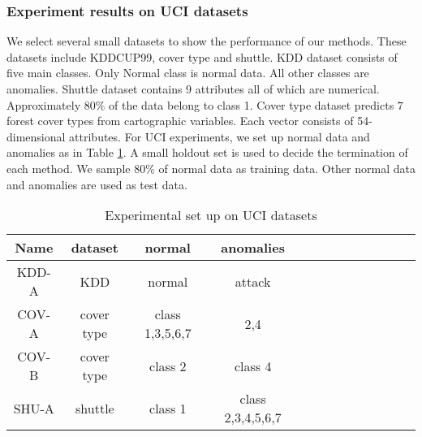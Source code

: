 \documentclass[a4paper,conference]{IEEEtran}
\begin{document}
\subsubsection{Experiment results on UCI datasets}
 We  select several small datasets  to show the performance of our methods. These datasets include KDDCUP99, cover type and shuttle. KDD dataset consists of five main classes. Only Normal class is normal data. All other classes are  anomalies. Shuttle dataset contains 9 attributes all of which are numerical. Approximately $80\%$ of the data belong to class 1. Cover type dataset predicts $7$ forest cover types from cartographic variables. Each vector consists of 54-dimensional attributes. For UCI experiments,  we set up normal data and anomalies as in Table \ref{UCI}. A small holdout set is used to decide the termination of each method.  We sample $80\%$ of normal data as training data. Other normal data and anomalies are used as test data.

\begin{table}[t]
\center\setlength{\belowcaptionskip}{5pt}
\caption{ Experimental set up on UCI datasets\label{UCI}}
\begin{tabular}{ccccccccccccc}
\hline
{Name} &{dataset} &{normal} & {anomalies}\\
\hline
KDD-A&KDD &normal&   attack  \\
\hline
COV-A&cover type&class 1,3,5,6,7&  2,4   \\
\hline
COV-B&cover type &class 2&    class 4 \\
\hline
SHU-A&shuttle &class 1&  class  2,3,4,5,6,7\\
\hline
\end{tabular}
\end{table}

\end{document}

